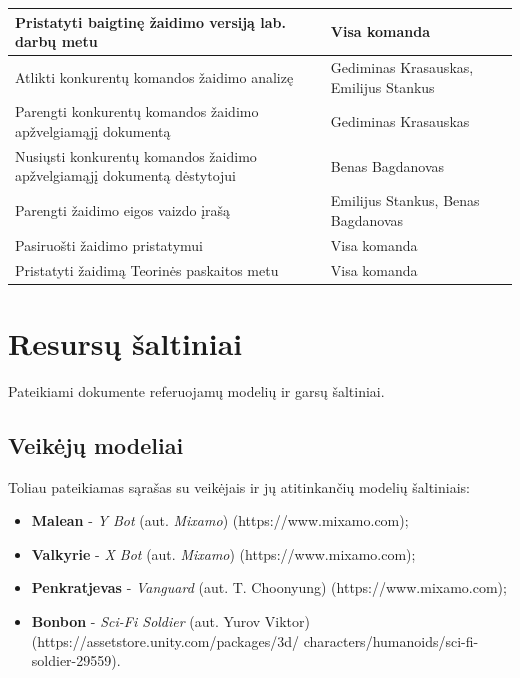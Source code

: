 \documentclass{VUMIFPSkursinis}
\begin{document}
{\begin{longtable}{|L{8,6cm}|L{6,1cm}|}
Pristatyti baigtinę žaidimo versiją lab. darbų metu &
Visa komanda \\ \hline

Atlikti konkurentų komandos žaidimo analizę &
Gediminas Krasauskas, Emilijus Stankus \\ \hline

Parengti konkurentų komandos žaidimo apžvelgiamąjį dokumentą &
Gediminas Krasauskas \\ \hline

Nusiųsti konkurentų komandos žaidimo apžvelgiamąjį dokumentą dėstytojui &
Benas Bagdanovas \\ \hline

Parengti žaidimo eigos vaizdo įrašą &
Emilijus Stankus, Benas Bagdanovas \\ \hline

Pasiruošti žaidimo pristatymui &
Visa komanda \\ \hline

Pristatyti žaidimą Teorinės paskaitos metu &
Visa komanda \\ \hline

\end{longtable}}



\section{Resursų šaltiniai}
Pateikiami dokumente referuojamų modelių ir garsų šaltiniai.


\subsection{Veikėjų modeliai}
Toliau pateikiamas sąrašas su veikėjais ir jų atitinkančių modelių šaltiniais:
\begin{itemize}
    \item \textbf{Malean} - \textit{Y Bot} (aut. \textit{Mixamo}) (https://www.mixamo.com);
    \item \textbf{Valkyrie} - \textit{X Bot} (aut. \textit{Mixamo}) (https://www.mixamo.com);
    \item \textbf{Penkratjevas} - \textit{Vanguard} (aut. T. Choonyung) (https://www.mixamo.com);
    \item \textbf{Bonbon} - \textit{Sci-Fi Soldier} (aut. Yurov Viktor) (https://assetstore.unity.com/packages/3d/ characters/humanoids/sci-fi-soldier-29559).
\end{itemize}
\end{document}
